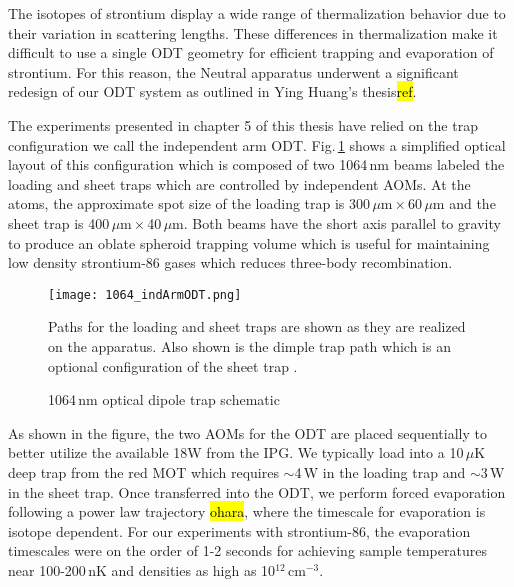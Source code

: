 The isotopes of strontium display a wide range of thermalization behavior due to their variation in scattering lengths.
These differences in thermalization make it difficult to use a single ODT geometry for efficient trapping and evaporation of strontium.
For this reason, the Neutral apparatus underwent a significant redesign of our ODT system as outlined in Ying Huang's thesis\hl{ref}.

The experiments presented in chapter 5 of this thesis have relied on the trap configuration we call the independent arm ODT.
Fig.\,\ref{fig:odtSchematic} shows a simplified optical layout of this configuration which is composed of two 1064\,nm beams labeled the loading and sheet traps which are controlled by independent AOMs.
At the atoms, the approximate spot size of the loading trap is 300\,$\mu$m\,$\times$\,60\,$\mu$m and the sheet trap is 400\,$\mu$m\,$\times$\,40\,$\mu$m.
Both beams have the short axis parallel to gravity to produce an oblate spheroid trapping volume which is useful for maintaining low density strontium-86 gases which reduces three-body recombination.
	\begin{figure} 
		\centerline{
		\texttt{[image: 1064\_indArmODT.png]}}
		\caption{1064\,nm optical dipole trap schematic}{Paths for the loading and sheet traps are shown as they are realized on the apparatus. Also shown is the dimple trap path which is an optional configuration of the sheet trap \cite{Huang2013}.}
		\label{fig:odtSchematic}
	\end{figure}

As shown in the figure, the two AOMs for the ODT are placed sequentially to better utilize the available 18W from the IPG.
We typically load into a 10\,$\mu$K deep trap from the red MOT which requires $\sim$4\,W in the loading trap and $\sim$3\,W in the sheet trap.
Once transferred into the ODT, we perform forced evaporation following a power law trajectory \hl{ohara}, where the timescale for evaporation is isotope dependent.
For our experiments with strontium-86, the evaporation timescales were on the order of 1-2 seconds for achieving sample temperatures near 100-200\,nK and densities as high as 10$^{12}$\,cm$^{-3}$.

